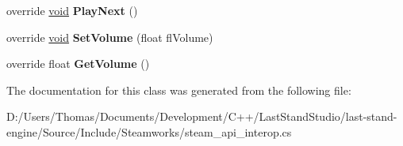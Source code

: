 \begin{DoxyCompactItemize}
\item 
\hypertarget{classValve_1_1Steamworks_1_1CSteamMusic_a2bbc4a5d8435f41c9f1fcb8a988681b4}{}override \hyperlink{SDL__audio_8h_a52835ae37c4bb905b903cbaf5d04b05f}{void} {\bfseries Play\+Next} ()\label{classValve_1_1Steamworks_1_1CSteamMusic_a2bbc4a5d8435f41c9f1fcb8a988681b4}

\item 
\hypertarget{classValve_1_1Steamworks_1_1CSteamMusic_aea59a86d58146599f84627872f39687f}{}override \hyperlink{SDL__audio_8h_a52835ae37c4bb905b903cbaf5d04b05f}{void} {\bfseries Set\+Volume} (float fl\+Volume)\label{classValve_1_1Steamworks_1_1CSteamMusic_aea59a86d58146599f84627872f39687f}

\item 
\hypertarget{classValve_1_1Steamworks_1_1CSteamMusic_a4ecaf454987a0b1accbfd9167b4926f3}{}override float {\bfseries Get\+Volume} ()\label{classValve_1_1Steamworks_1_1CSteamMusic_a4ecaf454987a0b1accbfd9167b4926f3}

\end{DoxyCompactItemize}


The documentation for this class was generated from the following file\+:\begin{DoxyCompactItemize}
\item 
D\+:/\+Users/\+Thomas/\+Documents/\+Development/\+C++/\+Last\+Stand\+Studio/last-\/stand-\/engine/\+Source/\+Include/\+Steamworks/steam\+\_\+api\+\_\+interop.\+cs\end{DoxyCompactItemize}
